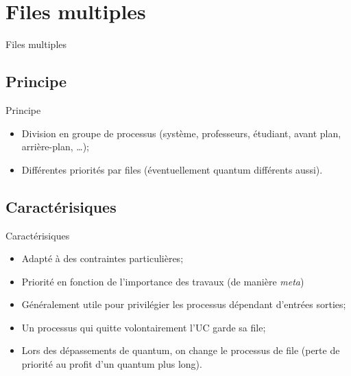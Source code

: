 \def\sectitle{Files multiples}
\section{\sectitle}
\begin{frame}{\sectitle}
\def\subsectitle{Principe}
\subsection{\subsectitle}

\begin{block}{\subsectitle}
\begin{itemize}
    \item Division en groupe de processus (système, professeurs, étudiant, avant
    plan, arrière-plan, \dots);
    \item Différentes priorités par files (éventuellement quantum différents
    aussi).
\end{itemize}
\end{block}


\def\subsectitle{Caractérisiques}
\subsection{\subsectitle}
\begin{block}{\subsectitle}
\begin{itemize}
    \item Adapté à des contraintes particulières;
    \item Priorité en fonction de l'importance des travaux (de manière
    \textit{meta})
    \item Généralement utile pour privilégier les processus dépendant d'entrées
    sorties;
    \item Un processus qui quitte volontairement l'UC garde sa file;
    \item Lors des dépassements de quantum, on change le processus de file
    (perte de priorité au profit d'un quantum plus long).
\end{itemize}
\end{block}

\end{frame}

